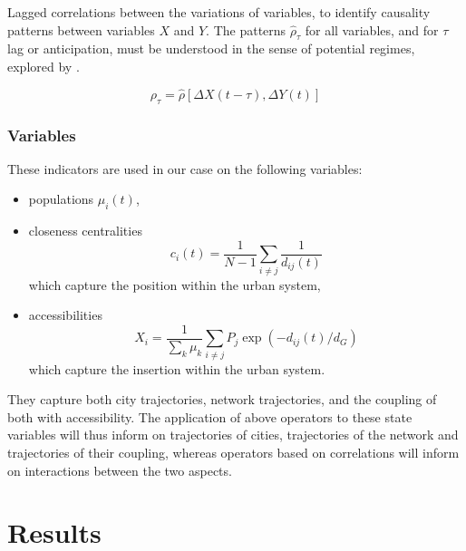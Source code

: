 Lagged correlations between the variations of variables, to identify causality patterns between variables $X$ and $Y$. The patterns $\hat{\rho}_{\tau}$ for all variables, and for $\tau$ lag or anticipation, must be understood in the sense of potential regimes, explored by \cite{raimbault2017identification}.

\begin{equation}
\rho_{\tau} = \hat{\rho}\left[\Delta X(t-\tau),\Delta Y(t)\right]
\end{equation}






\subsubsection{Variables}


These indicators are used in our case on the following variables:
\begin{itemize}
	\item populations $\mu_i(t)$,
	\item closeness centralities
	\[c_i(t) = \frac{1}{N-1}\sum_{i\neq j} \frac{1}{d_{ij}(t)}\]
	which capture the position within the urban system,
	\item accessibilities \[X_i = \frac{1}{\sum_k \mu_k}\sum_{i\neq j} P_j \exp{\left(- d_{ij}(t)/d_G\right)}\] which capture the insertion within the urban system.
\end{itemize}

They capture both city trajectories, network trajectories, and the coupling of both with accessibility. The application of above operators to these state variables will thus inform on trajectories of cities, trajectories of the network and trajectories of their coupling, whereas operators based on correlations will inform on interactions between the two aspects.



\section{Results}


